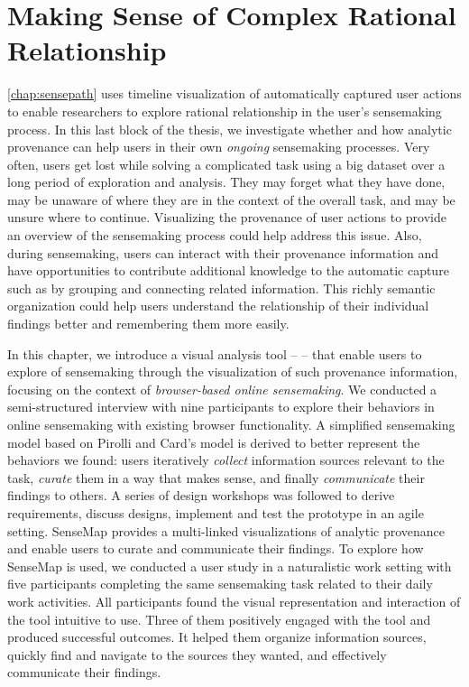 \chapter{Making Sense of Complex Rational Relationship}
\label{chap:sensemap}

\graphicspath{{Chapter6/figures/}}

\autoref{chap:sensepath} uses timeline visualization of automatically captured user actions to enable researchers to explore rational relationship in the user's sensemaking process. In this last block of the thesis, we investigate whether and how analytic provenance can help users in their own \emph{ongoing} sensemaking processes. Very often, users get lost while solving a complicated task using a big dataset over a long period of exploration and analysis. They may forget what they have done, may be unaware of where they are in the context of the overall task, and may be unsure where to continue. Visualizing the provenance of user actions to provide an overview of the sensemaking process could help address this issue. Also, during sensemaking, users can interact with their provenance information and have opportunities to contribute additional knowledge to the automatic capture such as by grouping and connecting related information. This richly semantic organization could help users understand the relationship of their individual findings better and remembering them more easily.

In this chapter, we introduce a visual analysis tool -- \emph{} -- that enable users to explore  of sensemaking through the visualization of such  provenance information, focusing on the context of \emph{browser-based online sensemaking}. We conducted a semi-structured interview with nine participants to explore their behaviors in online sensemaking with existing browser functionality. A simplified sensemaking model based on Pirolli and Card's model is derived to better represent the behaviors we found: users iteratively \emph{collect} information sources relevant to the task, \emph{curate} them in a way that makes sense, and finally \emph{communicate} their findings to others. A series of design workshops was followed to derive requirements, discuss designs, implement and test the prototype in an agile setting. SenseMap provides a multi-linked visualizations of analytic provenance and enable users to curate and communicate their findings. To explore how SenseMap is used, we conducted a user study in a naturalistic work setting with five participants completing the same sensemaking task related to their daily work activities. All participants found the visual representation and interaction of the tool intuitive to use. Three of them positively engaged with the tool and produced successful outcomes. It helped them organize information sources, quickly find and navigate to the sources they wanted, and effectively communicate their findings. 





